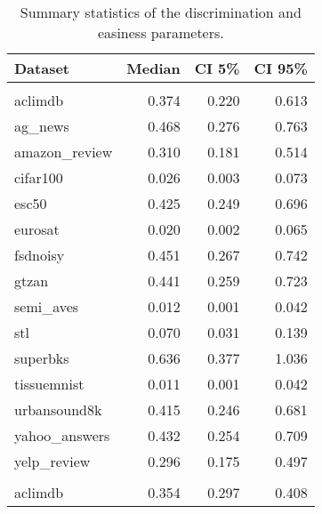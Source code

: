 \begin{table}[!h]

\caption{\label{tab:posterior-discrimination-easiness}Summary statistics of the discrimination and easiness parameters.}
\centering
\begin{tabular}[t]{lrrr}
\toprule
Dataset & Median & CI 5\% & CI 95\%\\
\midrule
\addlinespace[0.3em]
\multicolumn{4}{l}{\textbf{Discrimination value (a)}}\\
\hspace{1em}aclimdb & 0.374 & 0.220 & 0.613\\
\hspace{1em}ag\_news & 0.468 & 0.276 & 0.763\\
\hspace{1em}amazon\_review & 0.310 & 0.181 & 0.514\\
\hspace{1em}cifar100 & 0.026 & 0.003 & 0.073\\
\hspace{1em}esc50 & 0.425 & 0.249 & 0.696\\
\hspace{1em}eurosat & 0.020 & 0.002 & 0.065\\
\hspace{1em}fsdnoisy & 0.451 & 0.267 & 0.742\\
\hspace{1em}gtzan & 0.441 & 0.259 & 0.723\\
\hspace{1em}semi\_aves & 0.012 & 0.001 & 0.042\\
\hspace{1em}stl & 0.070 & 0.031 & 0.139\\
\hspace{1em}superbks & 0.636 & 0.377 & 1.036\\
\hspace{1em}tissuemnist & 0.011 & 0.001 & 0.042\\
\hspace{1em}urbansound8k & 0.415 & 0.246 & 0.681\\
\hspace{1em}yahoo\_answers & 0.432 & 0.254 & 0.709\\
\hspace{1em}yelp\_review & 0.296 & 0.175 & 0.497\\
\addlinespace[0.3em]
\multicolumn{4}{l}{\textbf{Easiness level (b)}}\\
\hspace{1em}aclimdb & 0.354 & 0.297 & 0.408\\

\end{tabular}
\end{table}
